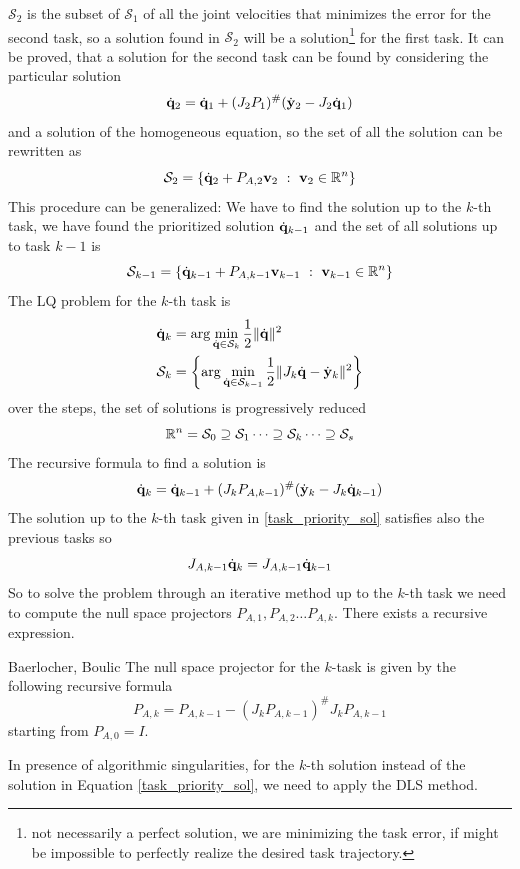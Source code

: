 \documentclass[10pt, a4paper]{report}
\begin{document}
$\mathcal S_2$ is the subset of $\mathcal S_1$ of all the joint velocities that minimizes the error for the second task, so a solution found in $\mathcal S_2$ will be a solution\footnote{
    not necessarily a perfect solution, we are minimizing the task error, if might be impossible to perfectly realize the desired task trajectory.
} for the first task. It can be proved, that a solution for the second task can be found by considering the particular solution\begin{equation}
    {\dot{\mathbf q}}_2={\dot{\mathbf q}}_1+(J_2P_1)^\#({\dot{\mathbf y}}_2-J_2{\dot{\mathbf q}}_1)
\end{equation}
and a solution of the homogeneous equation, so the set of all the solution can be rewritten as\begin{equation}
    \mathcal S_2=\left\{
    {\dot{\mathbf q}}_2+P_{A,2}\mathbf v_2 \ : \  \mathbf v_2\in {\mathbb R}^n
    \right\}
\end{equation}
This procedure can be generalized: We have to find the solution up to the $k$-th task, we have found the prioritized solution ${\dot{\mathbf q}}_{k-1}$ and the set of all solutions up to task $k-1$ is\begin{equation}
     \mathcal S_{k-1}=\left\{
    {\dot{\mathbf q}}_{k-1}+P_{A,k-1}\mathbf v_{k-1} \ : \  \mathbf v_{k-1}\in {\mathbb R}^n
    \right\}
\end{equation}
The LQ problem for the $k$-th task is\begin{align}
    &{\dot{\mathbf q}}_k=\arg\min_{{\dot{\mathbf q}}\in\mathcal S_k}\frac{1}{2}\|{\dot{\mathbf q}}\|^2\\
    &\mathcal S_k=\left\{ \arg\min_{{\dot{\mathbf q}}\in \mathcal S_{k-1}}\frac{1}{2}\|J_k{\dot{\mathbf q}}-{\dot{\mathbf y}}_k\|^2\right\}
\end{align}
over the steps, the set of solutions is progressively reduced\begin{equation}
    {\mathbb R}^n=\mathcal S_0\supseteq\mathcal S_1\dots \supseteq \mathcal S_k\dots \supseteq \mathcal S_s
\end{equation}
The recursive formula to find a solution is 
\begin{equation}\label{task_priority_sol}
     {\dot{\mathbf q}}_k={\dot{\mathbf q}}_{k-1}+(J_kP_{A,k-1})^\#({\dot{\mathbf y}}_k-J_k{\dot{\mathbf q}}_{k-1})
\end{equation}
The solution up to the $k$-th task given in \eqref{task_priority_sol} satisfies also the previous tasks so\begin{equation}
    J_{A,k-1}{\dot{\mathbf q}}_k=J_{A,k-1}{\dot{\mathbf q}}_{k-1}
\end{equation}
So to solve the problem through an iterative method up to the $k$-th task we need to compute the null space projectors $P_{A,1},P_{A,2}\dots P_{A,k}$. There exists a recursive expression.
\begin{boxproposition}{Baerlocher, Boulic}{}
    The null space projector for the $k$-task is given by the following recursive formula\begin{equation}
        P_{A,k}=P_{A,k-1}-(J_kP_{A,k-1})^\#J_kP_{A,k-1}
    \end{equation}
    starting from $P_{A,0}=I$.
\end{boxproposition}
In presence of algorithmic singularities, for the $k$-th solution instead of the solution in Equation \eqref{task_priority_sol}, we need to apply the DLS method.
\end{document}
